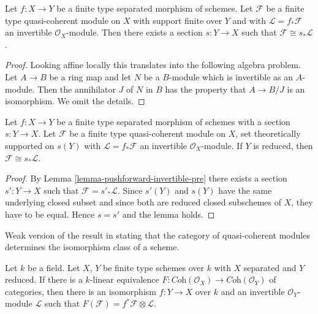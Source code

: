 \begin{lemma}
\label{lemma-pushforward-invertible-pre}
Let $f : X \to Y$ be a finite type separated morphism of schemes. Let
$\mathcal{F}$ be a finite type quasi-coherent module on $X$
with support finite over $Y$
and with $\mathcal{L} = f_*\mathcal{F}$ an invertible $\mathcal{O}_X$-module.
Then there exists a section $s : Y \to X$ such that
$\mathcal{F} \cong s_*\mathcal{L}$.
\end{lemma}

\begin{proof}
Looking affine locally this translates into the following algebra problem.
Let $A \to B$ be a ring map and let $N$ be a $B$-module which is
invertible as an $A$-module. Then the annihilator $J$ of $N$ in $B$
has the property that $A \to B/J$ is an isomorphism. We omit the details.
\end{proof}

\begin{lemma}
\label{lemma-pushforward-invertible}
Let $f : X \to Y$ be a finite type separated morphism of schemes with a section
$s : Y \to X$. Let $\mathcal{F}$ be a finite type quasi-coherent module
on $X$, set theoretically supported on $s(Y)$ with
$\mathcal{L} = f_*\mathcal{F}$
an invertible $\mathcal{O}_X$-module. If $Y$ is reduced, then
$\mathcal{F} \cong s_*\mathcal{L}$.
\end{lemma}

\begin{proof}
By Lemma \ref{lemma-pushforward-invertible-pre}
there exists a section $s' : Y  \to X$ such that
$\mathcal{F} = s'_*\mathcal{L}$. Since $s'(Y)$ and $s(Y)$
have the same underlying closed subset
and since both are reduced closed subschemes of $X$, they have to be equal.
Hence $s = s'$ and the lemma holds.
\end{proof}

\begin{lemma}
\label{lemma-equivalence-coherent-over-field}
\begin{reference}
Weak version of the result in \cite{Gabriel}
stating that the category of quasi-coherent modules
determines the isomorphism class of a scheme.
\end{reference}
Let $k$ be a field. Let $X$, $Y$ be finite type schemes over $k$ with
$X$ separated and $Y$ reduced. If there is a $k$-linear equivalence
$F : \textit{Coh}(\mathcal{O}_X) \to \textit{Coh}(\mathcal{O}_Y)$
of categories, then there is an isomorphism $f : Y \to X$
over $k$ and an invertible $\mathcal{O}_Y$-module $\mathcal{L}$
such that $F(\mathcal{F}) = f^*\mathcal{F} \otimes \mathcal{L}$.
\end{lemma}

